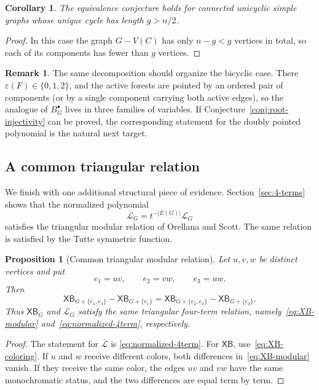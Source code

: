 \documentclass[11pt]{article}
\theoremstyle{plain}
\newtheorem{proposition}[theorem]{Proposition}
\newtheorem{corollary}[theorem]{Corollary}
\theoremstyle{definition}
\newtheorem{remark}[theorem]{Remark}
\renewcommand{\mathcal}{\mathscr}
\newcommand{\LL}{\mathcal{L}}    %
\newcommand{\XB}{\mathsf{XB}} %
\newcommand{\eps}{\varepsilon}
\numberwithin{equation}{section}
\begin{document}
\begin{corollary}\label{cor:unicyclic-long-cycle}
The equivalence conjecture holds for connected unicyclic simple graphs whose unique cycle has length $g>n/2$.
\end{corollary}

\begin{proof}
In this case the graph $G-V(C)$ has only $n-g<g$ vertices in total,
  so each of its components has fewer than $g$ vertices.
\end{proof}

\begin{remark}\label{rem:bicyclic}
The same decomposition should organize the bicyclic case.  There
$\eps(F)\in\{0,1,2\}$, and the active forests are pointed by an ordered pair
of components (or by a single component carrying both active edges), so the analogue
of $B_G^\bullet$ lives in three families of variables.
If Conjecture~\ref{conj:root-injectivity} can be proved,
the corresponding statement for the doubly pointed polynomial is the natural next target.
\end{remark}

\subsection{A common triangular relation}\label{subsec:further-common-structure}

We finish with one additional structural piece of evidence.
Section~\ref{sec:4-terms} shows that the normalized polynomial
\[
   \overline{\LL}_G=t^{-|E(G)|}\LL_G
\]
satisfies the triangular modular relation of Orellana and Scott.
The same relation is satisfied by the Tutte symmetric function.

\begin{proposition}[Common triangular modular relation]
\label{prop:common-modular-relation}
Let $u,v,w$ be distinct vertices and put
\[
   e_1=uv,\qquad e_2=vw,\qquad e_3=uw.
\]
Then
\begin{equation}\label{eq:XB-modular}
   \XB_{G+\{e_1,e_3\}}-\XB_{G+\{e_1\}}
   =
   \XB_{G+\{e_2,e_3\}}-\XB_{G+\{e_2\}}.
\end{equation}
Thus $\XB_G$ and $\overline{\LL}_G$ satisfy the same triangular four-term relation,
namely~\eqref{eq:XB-modular} and~\eqref{eq:normalized-4term}, respectively.
\end{proposition}

\begin{proof}
The statement for $\overline{\LL}$ is
\eqref{eq:normalized-4term}.  For $\XB$, use~\eqref{eq:XB-coloring}.  If $u$
and $w$ receive different colors, both differences in~\eqref{eq:XB-modular} vanish.
If they receive the same color, the edges $uv$ and $vw$ have the same monochromatic status,
and the two differences are equal term by term.
\end{proof}
\end{document}
